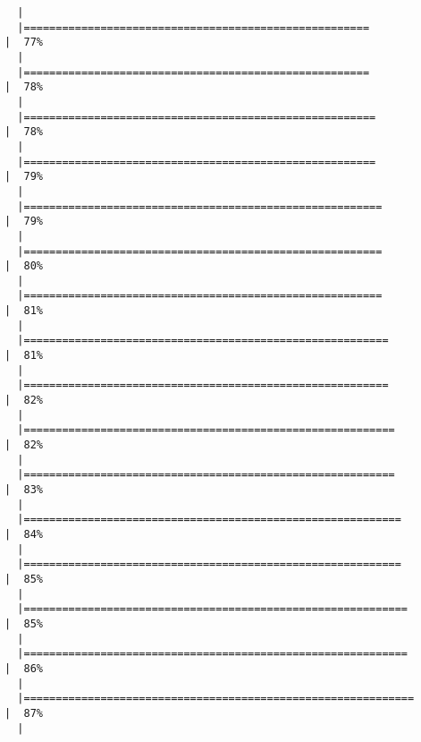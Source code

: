 \documentclass[
  letterpaper,
]{book}
\begin{document}
\begin{verbatim}
  |                                                                            
  |======================================================                |  77%
  |                                                                            
  |======================================================                |  78%
  |                                                                            
  |=======================================================               |  78%
  |                                                                            
  |=======================================================               |  79%
  |                                                                            
  |========================================================              |  79%
  |                                                                            
  |========================================================              |  80%
  |                                                                            
  |========================================================              |  81%
  |                                                                            
  |=========================================================             |  81%
  |                                                                            
  |=========================================================             |  82%
  |                                                                            
  |==========================================================            |  82%
  |                                                                            
  |==========================================================            |  83%
  |                                                                            
  |===========================================================           |  84%
  |                                                                            
  |===========================================================           |  85%
  |                                                                            
  |============================================================          |  85%
  |                                                                            
  |============================================================          |  86%
  |                                                                            
  |=============================================================         |  87%
  |                                                                            

\end{verbatim}
\end{document}
